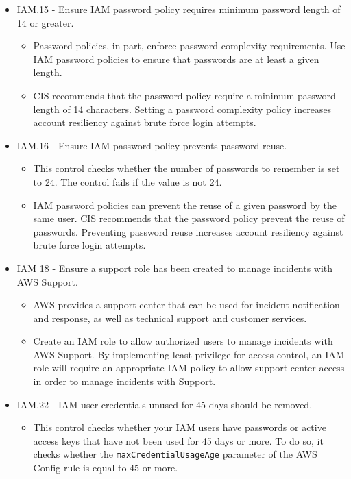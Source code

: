 \begin{mdframed}[backgroundcolor=gray!05, linecolor=gray!50]
\begin{itemize}
\begin{itemize}
    \end{itemize}
    \item IAM.15 - Ensure IAM password policy requires minimum password length of 14 or greater.
    \begin{itemize}
        \item Password policies, in part, enforce password complexity requirements. Use IAM password policies to ensure that passwords are at least a given length.
        \item CIS recommends that the password policy require a minimum password length of 14 characters. Setting a password complexity policy increases account resiliency against brute force login attempts.
    \end{itemize}
    \item IAM.16 - Ensure IAM password policy prevents password reuse.
    \begin{itemize}
        \item This control checks whether the number of passwords to remember is set to 24. The control fails if the value is not 24.
        \item IAM password policies can prevent the reuse of a given password by the same user. CIS recommends that the password policy prevent the reuse of passwords. Preventing password reuse increases account resiliency against brute force login attempts.
    \end{itemize}
    \item IAM 18 - Ensure a support role has been created to manage incidents with AWS Support.
    \begin{itemize}
        \item AWS provides a support center that can be used for incident notification and response, as well as technical support and customer services.
        \item Create an IAM role to allow authorized users to manage incidents with AWS Support. By implementing least privilege for access control, an IAM role will require an appropriate IAM policy to allow support center access in order to manage incidents with Support.
    \end{itemize}
    \item IAM.22 - IAM user credentials unused for 45 days should be removed.
    \begin{itemize}
        \item This control checks whether your IAM users have passwords or active access keys that have not been used for 45 days or more. To do so, it checks whether the \texttt{maxCredentialUsageAge} parameter of the AWS Config rule is equal to 45 or more.

\end{itemize}
\end{itemize}
\end{mdframed}
